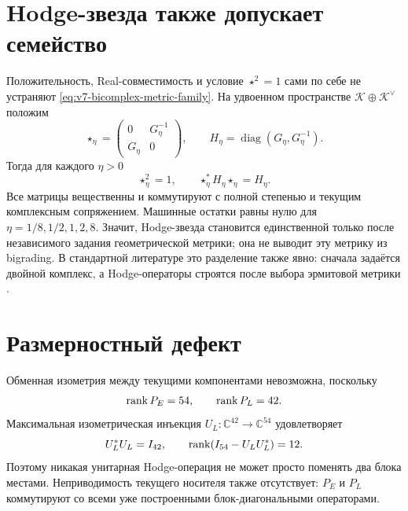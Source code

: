\section{Hodge-звезда также допускает семейство}

Положительность, Real-совместимость и условие $\star^2=1$ сами по себе не
устраняют \eqref{eq:v7-bicomplex-metric-family}. На удвоенном пространстве
$\mathcal K\oplus\mathcal K^\vee$ положим
\begin{equation}
 \star_\eta=
 \begin{pmatrix}
 0&G_\eta^{-1}\\
 G_\eta&0
 \end{pmatrix},
 \qquad
 H_\eta=\operatorname{diag}(G_\eta,G_\eta^{-1}).
 \label{eq:v7-bicomplex-hodge-family}
\end{equation}
Тогда для каждого $\eta>0$
\begin{equation}
 \star_\eta^2=1,
 \qquad
 \star_\eta^*H_\eta\star_\eta=H_\eta.
 \label{eq:v7-bicomplex-hodge-isometry}
\end{equation}
Все матрицы вещественны и коммутируют с полной степенью и текущим
комплексным сопряжением. Машинные остатки равны нулю для
$\eta=1/8,1/2,1,2,8$. Значит, Hodge-звезда становится единственной только
после независимого задания геометрической метрики; она не выводит эту
метрику из bigrading. В стандартной литературе это разделение также явно:
сначала задаётся двойной комплекс, а Hodge-операторы строятся после выбора
эрмитовой метрики \cite{v7-bicomplex-tardini-tomassini,
v7-bicomplex-popovici-stelzig-ugarte}.

\section{Размерностный дефект}

Обменная изометрия между текущими компонентами невозможна, поскольку
\begin{equation}
 \operatorname{rank} P_E=54,
 \qquad \operatorname{rank} P_L=42.
 \end{equation}
Максимальная изометрическая инъекция
$U_L:\mathbb C^{42}\to\mathbb C^{54}$ удовлетворяет
\begin{equation}
 U_L^*U_L=I_{42},
 \qquad
 \operatorname{rank}(I_{54}-U_LU_L^*)=12.
 \label{eq:v7-bicomplex-defect-twelve}
\end{equation}
Поэтому никакая унитарная Hodge-операция не может просто поменять два блока
местами. Неприводимость текущего носителя также отсутствует: $P_E$ и $P_L$
коммутируют со всеми уже построенными блок-диагональными операторами.

